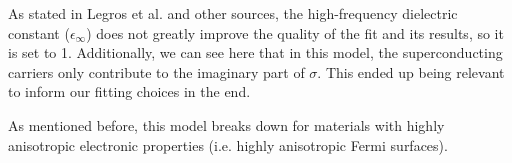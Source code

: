 As stated in Legros et al. and other sources, 
the high-frequency dielectric constant ($\epsilon_\infty$) does not greatly improve the quality of the fit and its results, so it is set to 1.
Additionally, we can see here that in this model, the superconducting carriers only contribute to the imaginary part of $\sigma$. 
This ended up being relevant to inform our fitting choices in the end.

As mentioned before, this model breaks down for materials with highly anisotropic electronic properties
(i.e. highly anisotropic Fermi surfaces).
